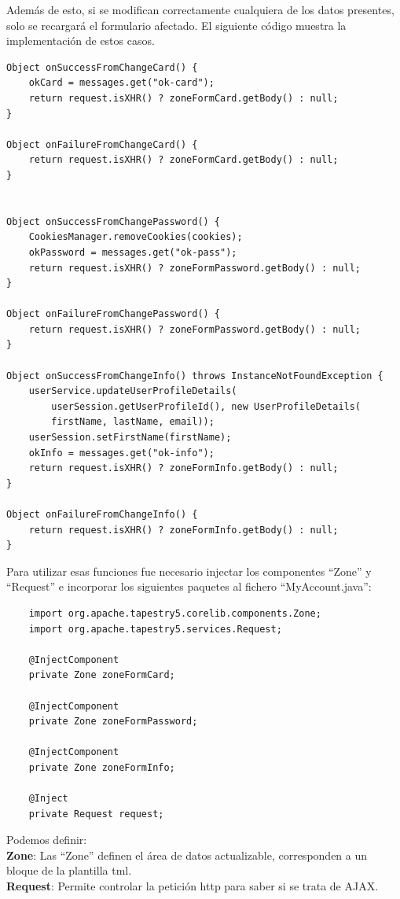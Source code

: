 \documentclass[12pt,a4paper,twoside,spanish]{article}      %
\begin{document}
Además de esto, si se modifican correctamente cualquiera de los datos presentes, solo se recargará el formulario afectado. El siguiente código muestra la 
implementación de estos casos.

\begin{verbatim}
Object onSuccessFromChangeCard() {
	okCard = messages.get("ok-card");
	return request.isXHR() ? zoneFormCard.getBody() : null;
}

Object onFailureFromChangeCard() {
	return request.isXHR() ? zoneFormCard.getBody() : null;
}
    

Object onSuccessFromChangePassword() {
	CookiesManager.removeCookies(cookies);
	okPassword = messages.get("ok-pass");
	return request.isXHR() ? zoneFormPassword.getBody() : null;
}
    
Object onFailureFromChangePassword() {
	return request.isXHR() ? zoneFormPassword.getBody() : null;
}
    
Object onSuccessFromChangeInfo() throws InstanceNotFoundException {
	userService.updateUserProfileDetails(
		userSession.getUserProfileId(), new UserProfileDetails(
		firstName, lastName, email));
	userSession.setFirstName(firstName);
	okInfo = messages.get("ok-info");
	return request.isXHR() ? zoneFormInfo.getBody() : null;
}
      
Object onFailureFromChangeInfo() {
	return request.isXHR() ? zoneFormInfo.getBody() : null;
}
\end{verbatim}

Para utilizar esas funciones fue necesario injectar los componentes ``Zone'' y ``Request'' e incorporar los siguientes paquetes al fichero 
``MyAccount.java'':
\begin{verbatim}
    import org.apache.tapestry5.corelib.components.Zone;
    import org.apache.tapestry5.services.Request;
 
    @InjectComponent
    private Zone zoneFormCard;
 
    @InjectComponent
    private Zone zoneFormPassword;
 
    @InjectComponent
    private Zone zoneFormInfo;
    
    @Inject
    private Request request;
\end{verbatim}

Podemos definir:\\
\textbf{Zone}: Las ``Zone'' definen el área de datos actualizable, corresponden a un bloque de la plantilla tml.\\
\textbf{Request}: Permite controlar la petición http para saber si se trata de AJAX.
\end{document}

